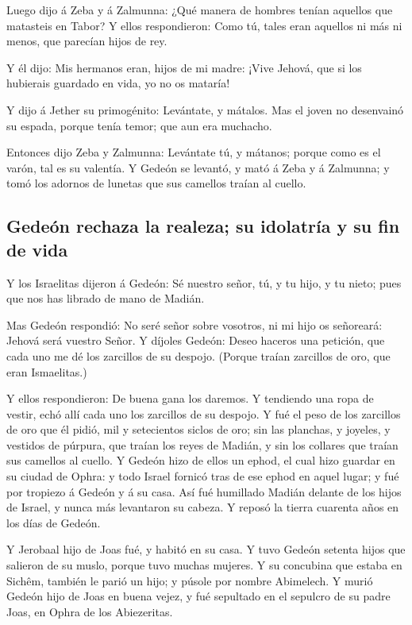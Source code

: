  Luego dijo á Zeba y á Zalmunna: ¿Qué manera de hombres
tenían aquellos que matasteis en Tabor? Y ellos respondieron: Como tú,
tales eran aquellos ni más ni menos, que parecían hijos de rey.

 Y él dijo: Mis hermanos eran, hijos de mi madre: ¡Vive
Jehová, que si los hubierais guardado en vida, yo no os mataría!

 Y dijo á Jether su primogénito: Levántate, y mátalos. Mas
el joven no desenvainó su espada, porque tenía temor; que aun era
muchacho.

 Entonces dijo Zeba y Zalmunna: Levántate tú, y mátanos;
porque como es el varón, tal es su valentía. Y Gedeón se levantó, y mató
á Zeba y á Zalmunna; y tomó los adornos de lunetas que sus camellos
traían al cuello.

\hypertarget{gedeuxf3n-rechaza-la-realeza-su-idolatruxeda-y-su-fin-de-vida}{%
\subsection{Gedeón rechaza la realeza; su idolatría y su fin de
vida}\label{gedeuxf3n-rechaza-la-realeza-su-idolatruxeda-y-su-fin-de-vida}}

 Y los Israelitas dijeron á Gedeón: Sé nuestro señor, tú, y
tu hijo, y tu nieto; pues que nos has librado de mano de Madián.

 Mas Gedeón respondió: No seré señor sobre vosotros, ni mi
hijo os señoreará: Jehová será vuestro Señor.  Y díjoles
Gedeón: Deseo haceros una petición, que cada uno me dé los zarcillos de
su despojo. (Porque traían zarcillos de oro, que eran Ismaelitas.)

 Y ellos respondieron: De buena gana los daremos. Y
tendiendo una ropa de vestir, echó allí cada uno los zarcillos de su
despojo.  Y fué el peso de los zarcillos de oro que él
pidió, mil y setecientos siclos de oro; sin las planchas, y joyeles, y
vestidos de púrpura, que traían los reyes de Madián, y sin los collares
que traían sus camellos al cuello.  Y Gedeón hizo de ellos
un ephod, el cual hizo guardar en su ciudad de Ophra: y todo Israel
fornicó tras de ese ephod en aquel lugar; y fué por tropiezo á Gedeón y
á su casa.  Así fué humillado Madián delante de los hijos
de Israel, y nunca más levantaron su cabeza. Y reposó la tierra cuarenta
años en los días de Gedeón.

 Y Jerobaal hijo de Joas fué, y habitó en su casa.
 Y tuvo Gedeón setenta hijos que salieron de su muslo,
porque tuvo muchas mujeres.  Y su concubina que estaba en
Sichêm, también le parió un hijo; y púsole por nombre Abimelech.
 Y murió Gedeón hijo de Joas en buena vejez, y fué
sepultado en el sepulcro de su padre Joas, en Ophra de los Abiezeritas.


